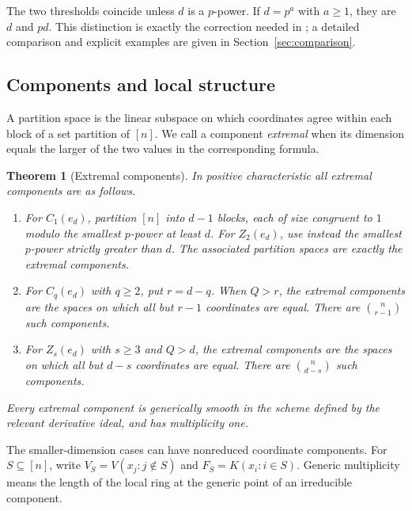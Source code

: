 \documentclass[11pt]{article}
\newtheorem{theorem}{Theorem}[section]
\theoremstyle{remark}
\begin{document}
The two thresholds coincide unless $d$ is a $p$-power. If $d=p^a$
with $a\ge1$, they are $d$ and $pd$. This distinction is exactly
the correction needed in \cite[Conjecture~2.11]{Orzel}; a detailed
comparison and explicit examples are given in Section~\ref{sec:comparison}.

\subsection{Components and local structure}

A partition space is the linear subspace on which coordinates agree
within each block of a set partition of $[n]$. We call a component
\emph{extremal} when its dimension equals the larger of the two values
in the corresponding formula.

\begin{theorem}[Extremal components]\label{thm:components}
In positive characteristic all extremal components are as follows.
\begin{enumerate}
\item For $C_1(e_d)$, partition $[n]$ into $d-1$ blocks, each of size
congruent to $1$ modulo the smallest $p$-power at least $d$.
For $Z_2(e_d)$, use instead the smallest $p$-power strictly greater
than $d$. The associated partition spaces are exactly the extremal
components.
\item For $C_q(e_d)$ with $q\ge2$, put $r=d-q$. When $Q>r$, the
extremal components are the spaces on which all but $r-1$ coordinates
are equal. There are $\binom{n}{r-1}$ such components.
\item For $Z_s(e_d)$ with $s\ge3$ and $Q>d$, the extremal components
are the spaces on which all but $d-s$ coordinates are equal. There
are $\binom{n}{d-s}$ such components.
\end{enumerate}
Every extremal component is generically smooth in the scheme defined
by the relevant derivative ideal, and has multiplicity one.
\end{theorem}

The smaller-dimension cases can have nonreduced coordinate components.
For $S\subseteq[n]$, write $V_S=V(x_j:j\notin S)$ and
$F_S=K(x_i:i\in S)$. Generic multiplicity means the length of the
local ring at the generic point of an irreducible component.
\end{document}
